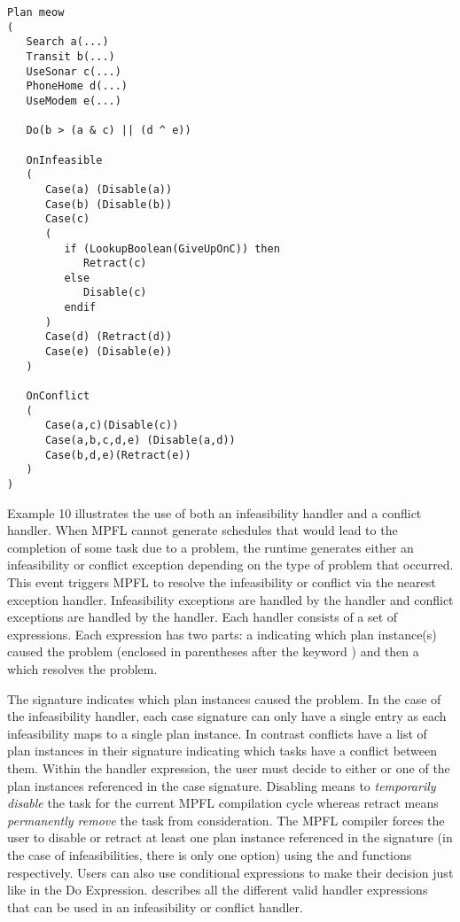 \begin{verbatim}
Plan meow
(
   Search a(...)
   Transit b(...)
   UseSonar c(...)
   PhoneHome d(...)
   UseModem e(...)

   Do(b > (a & c) || (d ^ e))

   OnInfeasible   
   (
      Case(a) (Disable(a))
      Case(b) (Disable(b))
      Case(c) 
      (
         if (LookupBoolean(GiveUpOnC)) then
            Retract(c)
         else
            Disable(c)
         endif
      )
      Case(d) (Retract(d))
      Case(e) (Disable(e))      
   )
   
   OnConflict
   (
      Case(a,c)(Disable(c))
      Case(a,b,c,d,e) (Disable(a,d))
      Case(b,d,e)(Retract(e))
   )
)
\end{verbatim}

Example 10 illustrates the use of both an infeasibility handler and a conflict handler. When MPFL cannot generate schedules that would lead to the completion of some task due to a problem, the runtime generates either an infeasibility or conflict exception depending on the type of problem that occurred. This event triggers MPFL to resolve the infeasibility or conflict via the nearest exception handler. Infeasibility exceptions are handled by the  handler and conflict exceptions are handled by the  handler. Each handler consists of a set of  expressions. Each expression has two parts: a  indicating which plan instance(s) caused the problem (enclosed in parentheses after the keyword ) and then a  which resolves the problem. 

The signature indicates which plan instances caused the problem. In the case of the infeasibility handler, each case signature can only have a single entry as each infeasibility maps to a single plan instance. In contrast conflicts have a list of plan instances in their signature indicating which tasks have a conflict between them. Within the handler expression, the user must decide to either  or  one of the plan instances referenced in the case signature. Disabling means to \textit{temporarily disable} the task for the current MPFL compilation cycle whereas retract means \textit{permanently remove} the task from consideration. The MPFL compiler forces the user to disable or retract at least one plan instance referenced in the signature (in the case of infeasibilities, there is only one option) using the  and  functions respectively. Users can also use conditional expressions to make their decision just like in the Do Expression.  describes all the different valid handler expressions that can be used in an infeasibility or conflict handler.

